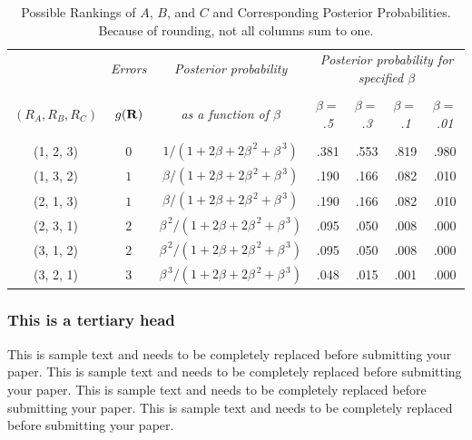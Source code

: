 \documentclass{asaproc}
\begin{document}
\begin{table}
\caption{\enspace Possible Rankings of $A$, $B$, and $C$ and Corresponding 
Posterior Probabilities.  Because of rounding, not all columns sum to 
one.}\label{tab1}
\begin{tabular*}{\hsize}{@{\extracolsep{\fill}}ccccccc}
\\[-5pt]
                 & 
\multicolumn{1}{c}{\it Errors} & 
\multicolumn{1}{c}{\it Posterior probability} & 
\multicolumn{4}{c}{\it Posterior probability for specified $\beta$}\\
\cline{4-7}
\\[-7pt]
\multicolumn{1}{c}{\it $(R_A,R_B,R_C)$}  & 
\multicolumn{1}{c}{\it $g({\bf R})$} & 
\multicolumn{1}{c}{\it as a function of $\beta$} & 
\multicolumn{1}{c}{\it $\beta =$ .5} & 
\multicolumn{1}{c}{\it $\beta =$ .3} & 
\multicolumn{1}{c}{\it $\beta =$ .1} & 
\multicolumn{1}{c}{\it $\beta =$ .01}\\
\hline
\\[-5pt]
(1, 2, 3)& $0$ & $1 / (1 + 2\beta + 2\beta^{\,2} + \beta^{\,3})$ & 
        .381 & .553 & .819 & .980 \\ 
(1, 3, 2)& $1$ & $\beta/ (1 + 2\beta + 2\beta^{\,2} + \beta^{\,3})$ & 
        .190 & .166 & .082 & .010 \\
(2, 1, 3)& $1$ & $\beta/ (1 + 2\beta + 2\beta^{\,2} + \beta^{\,3})$ & 
        .190 & .166 & .082 & .010 \\
(2, 3, 1)& $2$ & $\beta^{\,2}/ (1 + 2\beta + 2\beta^{\,2} + \beta^{\,3})$ & 
        .095 & .050 & .008 & .000 \\
(3, 1, 2)& $2$ & $\beta^{\,2}/ (1 + 2\beta + 2\beta^{\,2} + \beta^{\,3})$ &  
         .095 &  .050 &  .008 &  .000 \\
(3, 2, 1)& $3$ & $\beta^{\,3}/ (1 + 2\beta + 2\beta^{\,2} + \beta^{\,3})$ & 
         .048 &  .015 &  .001 &   .000 \\
\hline
\end{tabular*}
\end{table} 

\subsubsection{This is a tertiary head} 

This is sample text and needs to be completely replaced before submitting your paper. This is sample text and needs to be completely replaced before submitting your paper. This is sample text and needs to be completely replaced before submitting your paper. This is sample text and needs to be completely replaced before submitting your paper.
\end{document}
